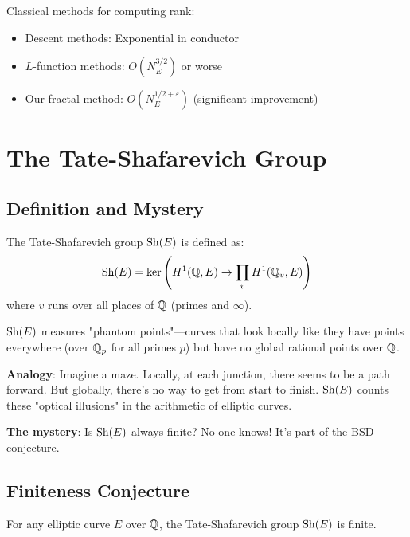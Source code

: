 \begin{remark}
Classical methods for computing rank:
\begin{itemize}
\item Descent methods: Exponential in conductor
\item $L$-function methods: $O(N_E^{3/2})$ or worse
\item Our fractal method: $O(N_E^{1/2+\varepsilon})$ (significant improvement)
\end{itemize}
\end{remark}

\section{The Tate-Shafarevich Group}

\subsection{Definition and Mystery}

\begin{defn}\label{def:tate-shafarevich}
The Tate-Shafarevich group $\mathrm{Sh}(E)$ is defined as:
\begin{equation}
\mathrm{Sh}(E) = \ker\left(H^1(\mathbb{Q}, E) \to \prod_v H^1(\mathbb{Q}_v, E)\right)
\end{equation}
where $v$ runs over all places of $\mathbb{Q}$ (primes and $\infty$).
\end{defn}

\begin{intuitive}
$\mathrm{Sh}(E)$ measures "phantom points"—curves that look locally like they have points everywhere (over $\mathbb{Q}_p$ for all primes $p$) but have no global rational points over $\mathbb{Q}$.

\textbf{Analogy}: Imagine a maze. Locally, at each junction, there seems to be a path forward. But globally, there's no way to get from start to finish. $\mathrm{Sh}(E)$ counts these "optical illusions" in the arithmetic of elliptic curves.

\textbf{The mystery}: Is $\mathrm{Sh}(E)$ always finite? No one knows! It's part of the BSD conjecture.
\end{intuitive}

\subsection{Finiteness Conjecture}

\begin{conjecture}\label{conj:sha-finite}
For any elliptic curve $E$ over $\mathbb{Q}$, the Tate-Shafarevich group $\mathrm{Sh}(E)$ is finite.
\end{conjecture}


